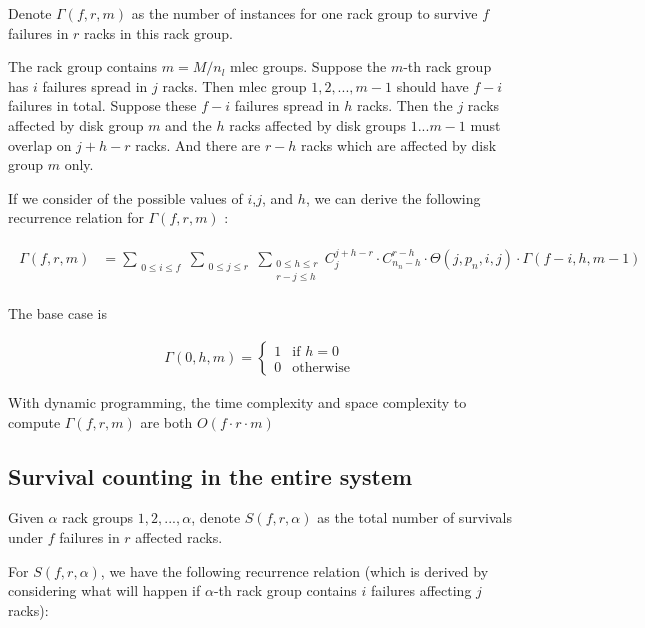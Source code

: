 \documentclass{article}
\begin{document}
Denote $\Gamma(f,r,m)$ as the number of instances for one rack group to survive $f$ failures in $r$ racks in this rack group.

The rack group contains $m = M / n_l$ mlec groups. Suppose the $m$-th rack group has $i$ failures spread in $j$ racks. Then mlec group $1,2,...,m-1$ should have $f-i$ failures in total. Suppose these $f-i$ failures spread in $h$ racks. Then the $j$ racks affected by disk group $m$ and the $h$ racks affected by disk groups $1...m-1$ must overlap on $j+h-r$ racks. And there are $r-h$ racks which are affected by disk group $m$ only.

If we consider of the possible values of $i$,$j$, and $h$, we can derive the following recurrence relation for $\Gamma(f,r,m)$ :

\begin{eqnarray}
\begin{aligned}
  \Gamma(f,r,m) &= \sum_{\substack{0 \leq i \leq f}} 
                \sum_{\substack{0 \leq j \leq r}}
                \sum_{\substack{0 \leq h \leq r \\ r-j \leq h}}
                C_{j}^{j+h-r} \cdot C_{n_n-h}^{r-h} \cdot \Theta(j,p_n,i,j)
                \cdot \Gamma(f-i, h, m-1) 
\end{aligned}
\label{eq:mlec:4}
\end{eqnarray}

The base case is 

\begin{eqnarray}
  \Gamma(0,h,m) =
    \begin{cases}
      1 & \text{if $h=0$}\\
      0 & \text{otherwise}
    \end{cases}       
\label{eq:mlec:5}
\end{eqnarray}

With dynamic programming, the time complexity and space complexity to compute $\Gamma(f,r,m)$ are both $O(f \cdot r \cdot m)$

\subsection{Survival counting in the entire system}

Given $\alpha$ rack groups $1,2,...,\alpha$, denote $S(f,r, \alpha)$ as the total number of survivals under $f$ failures in $r$ affected racks.

For $S(f,r,\alpha)$, we have the following recurrence relation (which is derived by considering what will happen if $\alpha$-th rack group contains $i$ failures affecting $j$ racks):
\end{document}
